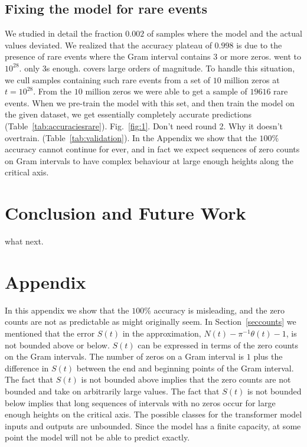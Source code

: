 \documentclass[journal]{IEEEtai}
\begin{document}
\subsection{\label{rarefix}Fixing the model for rare events}
We studied in detail the fraction $0.002$ of samples where the model and the actual values deviated. 
We realized that the accuracy plateau of $0.998$ is due to the presence of rare events where the Gram interval contains $3$ or more zeros. went to $10^{28}$. only 3s enough. covers large orders of magnitude. To handle this situation, we cull samples containing such rare events from a set of $10$ million zeros at $t=10^{28}$. From the $10$ million zeros we were able to get a sample of $19616$ rare events. When we pre-train the model with this set, and then train the model on the given dataset, we get essentially completely accurate predictions (Table~\ref{tab:accuraciesrare}). Fig.~\ref{fig:1}.  Don't need round 2. Why it doesn't overtrain. (Table~\ref{tab:validation}). In the Appendix we show that the $100\%$ accuracy cannot continue for ever, and in fact we expect sequences of zero counts on Gram intervals to have complex behaviour at large enough heights along the critical axis.

\section{Conclusion and Future Work}

what next.


\section*{\label{appendix}Appendix}

In this appendix we show that the $100\%$ accuracy is misleading, and the zero counts are not as predictable as might originally seem. In Section~\ref{seccounts} we mentioned that
the error $S(t)$ in the approximation, $N (t) - \pi^{-1}\theta(t) -1$, is not bounded above or below. $S(t)$ can be expressed in terms of the zero counts on the Gram intervals. The number of zeros on a Gram interval is $1$ plus the difference in $S(t)$ between the end and beginning points of the Gram interval. The fact that $S(t)$ is not bounded above implies that the zero counts are not bounded and take on arbitrarily large values. The fact that $S(t)$ is not bounded below implies that  long sequences of intervals with no zeros occur for large enough heights on the critical axis. 
The possible classes for the transformer model inputs and outputs are unbounded. Since the model has a finite capacity, at some point the model will not be able to predict exactly. 
\end{document}
